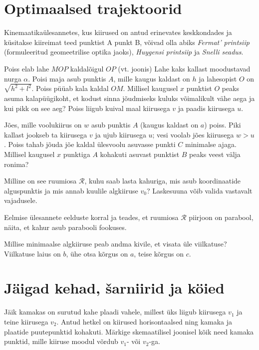 \documentclass[a4paper,11pt,twocolumn]{article}
\begin{document}
\section{Optimaalsed trajektoorid}
Kinemaatikaülesannetes, kus kiirused on antud erinevates keskkondades ja küsitakse kiireimat teed punktist A punkt B, võivad olla abiks \textit{Fermat' printsiip} (formuleeritud geomeetrilise optika jaoks), \textit{Huygensi printsiip} ja \textit{Snelli seadus}.
\begin{question}[kin4][3.8cm]
	Poiss elab lahe $ MOP $ kaldalõigul $ OP $ (vt. joonis) Lahe kaks kallast moodustavad nurga $ \alpha $. Poisi maja asub punktis $ A $, mille kaugus kaldast on $ h $ ja lahesopist $ O $ on $\sqrt{h^2+l^2} $. Poiss püüab kala kaldal $ OM $. Millisel kaugusel $ x $ punktist $ O $ peaks asuma kalapüügikoht, et kodust sinna jõudmiseks kuluks võimalikult vähe aega ja kui pikk on see aeg? Poiss liigub kuival maal kiirusega $ v $ ja paadis kiirusega $ u $.
\end{question}
\begin{question}[kin5][5.3cm]
	Jões, mille voolukiirus on $ w $ asub punktis $ A $ (kaugus kaldast on $ a $) poiss. Piki kallast jookseb ta kiirusega $ v $ ja ujub kiirusega $ u $; vesi voolab jões kiirusega $ w>u $. Poiss tahab jõuda jõe kaldal ülesvoolu asuvasse punkti $ C $ minimalse ajaga. Millisel kaugusel $ x $ punktiga $ A $ kohakuti asuvast punktist $ B $ peaks veest välja ronima?
\end{question}
\begin{question}
	Milline on see ruumiosa $ \mathcal{R} $, kuhu saab lasta kahuriga, mis asub koordinaatide alguspunktis ja mis annab kuulile algkiiruse $ v_0 $? Laskesuuna võib valida vastavalt vajadusele.
\end{question}
\begin{question}
	Eelmise ülesannete eelduste korral ja teades, et ruumiosa $ \mathcal{R} $ piirjoon on parabool, näita, et kahur asub parabooli fookuses.
\end{question}
\begin{question}
	Millise minimaalse algkiiruse peab andma kivile, et visata üle viilkatuse? Viilkatuse laius on $ b $, ühe otsa kõrgus on $ a $, teise kõrgus on $ c $.
\end{question}

\section{Jäigad kehad, šarniirid ja köied}
\begin{question}[kin6][5cm]
	Jäik kamakas on surutud kahe plaadi vahele, millest üks liigub kiirusega $ v_1 $ ja teine kiirusega $ v_2 $. Antud hetkel on kiirused horisontaalsed ning kamaka ja plaatide puutepunktid kohakuti. Märkige skemaatilisel joonisel kõik need kamaka punktid, mille kiiruse moodul võrdub $ v_1 $- või $ v_2 $-ga.
\end{question}
\end{document}
